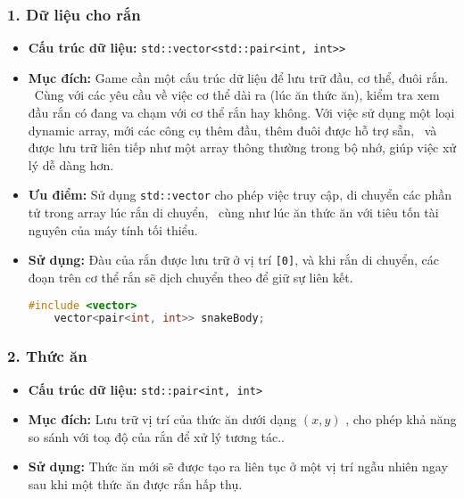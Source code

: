 \documentclass[12pt]{report}
\begin{document}
\subsubsection*{1. Dữ liệu cho rắn}
\begin{itemize}
    \item \textbf{Cấu trúc dữ liệu:} \texttt{std::vector<std::pair<int, int>>}
    \item \textbf{Mục đích:} Game cần một cấu trúc dữ liệu để lưu trữ đầu, cơ thể, đuôi rắn. \
          Cùng với các yêu cầu về việc cơ thể dài ra (lúc ăn thức ăn), kiểm tra xem đầu rắn có đang va chạm với cơ thể rắn hay không.
          Với việc sử dụng một loại dynamic array, mới các công cụ thêm đầu, thêm đuôi được hỗ trợ sẵn, \
          và được lưu trữ liên tiếp như một array thông thường trong bộ nhớ, giúp việc xử lý dễ dàng hơn.
    \item \textbf{Ưu điểm:} Sử dụng \texttt{std::vector} cho phép việc truy cập, di chuyển các phần tử trong array lúc rắn di chuyển, \
          cùng như lúc ăn thức ăn với tiêu tốn tài nguyên của máy tính tối thiểu.
    \item \textbf{Sử dụng:} Đàu của rắn được lưu trữ ở vị trí \texttt{[0]}, và khi rắn di chuyển, các đoạn trên cơ thể rắn sẽ dịch chuyển theo để giữ sự liên kết.
          \begin{footnotesize}
              \begin{lstlisting}[language=C++]
    #include <vector>
    vector<pair<int, int>> snakeBody;
    \end{lstlisting}
          \end{footnotesize}
\end{itemize}

\subsubsection*{2. Thức ăn}
\begin{itemize}
    \item \textbf{Cấu trúc dữ liệu:} \texttt{std::pair<int, int>}
    \item \textbf{Mục đích:} Lưu trữ vị trí của thức ăn dưới dạng $(x, y)$ , cho phép khả năng so sánh với toạ độ của rắn để xử lý tương tác..
    \item \textbf{Sử dụng:} Thức ăn mới sẽ được tạo ra liên tục ở một vị trí ngẫu nhiên ngay sau khi một thức ăn được rắn hấp thụ.
\end{itemize}
\end{document}
